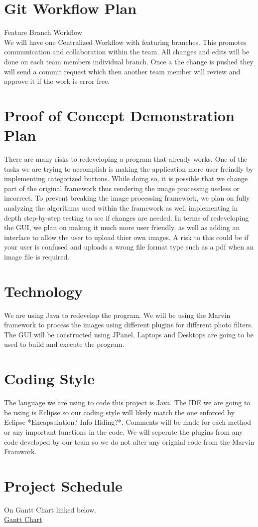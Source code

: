 \documentclass{article}
\begin{document}
\section{Git Workflow Plan}
Feature Branch Workflow\\
We will have one Centralized Workflow with featuring branches. This promotes communication and collaboration within the team. All changes and edits will be done on each team members individual branch. Once a the change is pushed they will send a commit request which then another team member will review and approve it if the work is error free.

\section{Proof of Concept Demonstration Plan}
There are many risks to redeveloping a program that already works. One of the tasks we are trying to accomplish is making the application more user freindly by implementing categorized buttons. While doing so, it is possible that we change part of the original framework thus rendering the image processing useless or incorrect. To prevent breaking the image processing framework, we plan on fully analyzing the algorithms used within the framework as well implementing in depth step-by-step testing to see if changes are needed. In terms of redeveloping the GUI, we plan on making it much more user friendly, as well as adding an interface to allow the user to upload thier own images. A risk to this could be if your user is confused and uploads a wrong file format type such as a pdf when an image file is required.

\section{Technology}
We are using Java to redevelop the program. We will be using the Marvin framework to process the images using different plugins for different photo filters. The GUI will be constructed using JPanel. Laptops and Desktops are going to be used to build and execute the program.

\section{Coding Style}
The language we are using to code this project is Java. The IDE we are going to be using is Eclipse so our coding style will likely match the one enforced by Eclipse *Encapsulation? Info Hiding?*. Comments will be made for each method or any important functions in the code. We will seperate the plugins from any code developed by our team so we do not alter any orignial code from the Marvin Framwork.

\section{Project Schedule}
On Gantt Chart linked below.\\
\href{https://gitlab.cas.mcmaster.ca/dimitn/image_processing_app/blob/master/ProjectSchedule/3XA3Gantt.pdf}{Gantt Chart}
\end{document}

